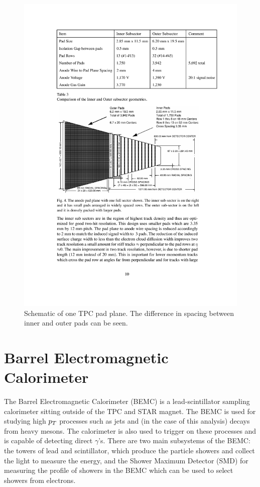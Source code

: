 \begin{figure}[htbp]
\begin{center}
\includegraphics[scale=1.0]{Plots/Detector/TPC_pad.pdf}
\end{center}
\caption[TPC Sector]{Schematic of one TPC pad plane. The difference in spacing between inner and outer pads can be seen.}
\label{fig:TPC_pad}
\end{figure}

\section{Barrel Electromagnetic Calorimeter}

The Barrel Electromagnetic Calorimeter (BEMC) is a lead-scintillator sampling calorimeter sitting outside of the TPC and STAR magnet. The BEMC is used for studying high $p_{T}$ processes such as jets and (in the case of this analysis) decays from heavy mesons. The calorimeter is also used to trigger on these processes and is capable of detecting direct $\gamma$'s. There are two main subsystems of the BEMC: the towers of lead and scintillator, which produce the particle showers and collect the light to measure the energy, and the Shower Maximum Detector (SMD) for measuring the profile of showers in the BEMC which can be used to select showers from electrons.

